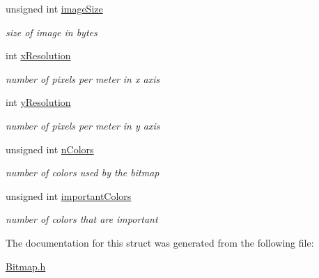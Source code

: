 \begin{DoxyCompactItemize}
unsigned int \hyperlink{group___bitmap_gadcd57a0168319e747bc8099218d3822c}{image\+Size}
\begin{DoxyCompactList}\small\item\em size of image in bytes \end{DoxyCompactList}\item 
int \hyperlink{group___bitmap_gac6eaeb4c0876cf6cd899f41fe3c25ff5}{x\+Resolution}
\begin{DoxyCompactList}\small\item\em number of pixels per meter in x axis \end{DoxyCompactList}\item 
int \hyperlink{group___bitmap_gaa2f350dd0bda750656d5db5f5e37b2b3}{y\+Resolution}
\begin{DoxyCompactList}\small\item\em number of pixels per meter in y axis \end{DoxyCompactList}\item 
unsigned int \hyperlink{group___bitmap_gaed4506bad904845183194f199f1bdb98}{n\+Colors}
\begin{DoxyCompactList}\small\item\em number of colors used by the bitmap \end{DoxyCompactList}\item 
unsigned int \hyperlink{group___bitmap_ga8f7abfbc446b12f385d2b42c3b4fd9b0}{important\+Colors}
\begin{DoxyCompactList}\small\item\em number of colors that are important \end{DoxyCompactList}\end{DoxyCompactItemize}


The documentation for this struct was generated from the following file\+:\begin{DoxyCompactItemize}
\item 
\hyperlink{_bitmap_8h}{Bitmap.\+h}\end{DoxyCompactItemize}
